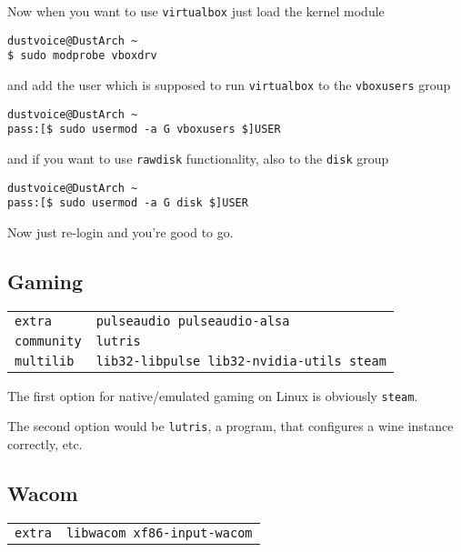 \documentclass[9pt]{report}
\newenvironment{packagetable}
{\begin{longtabu}to \textwidth [b]{X[1,r]|X[1,l]}}
{\end{longtabu}}
\begin{document}
Now when you want to use \texttt{virtualbox} just load the kernel module


\begin{verbatim}
dustvoice@DustArch ~
$ sudo modprobe vboxdrv
\end{verbatim}

and add the user which is supposed to run \texttt{virtualbox} to the \texttt{vboxusers} group


\begin{verbatim}
dustvoice@DustArch ~
pass:[$ sudo usermod -a G vboxusers $]USER
\end{verbatim}

and if you want to use \texttt{rawdisk} functionality, also to the \texttt{disk} group


\begin{verbatim}
dustvoice@DustArch ~
pass:[$ sudo usermod -a G disk $]USER
\end{verbatim}

Now just re-login and you’re good to go.



\newpage

\hypertarget{x-gaming}{\subsection{Gaming}}
\begin{packagetable}
    \texttt{extra} & \texttt{pulseaudio pulseaudio-alsa} \\ 
    \texttt{community} & \texttt{lutris} \\ 
    \texttt{multilib} & \texttt{lib32-libpulse lib32-nvidia-utils steam} \\ 
\end{packagetable}

The first option for native/emulated gaming on Linux is obviously \texttt{steam}.


The second option would be \texttt{lutris}, a program, that configures a wine instance correctly, etc.



\newpage

\hypertarget{x-wacom}{\subsection{Wacom}}
\begin{packagetable}
    \texttt{extra} & \texttt{libwacom xf86-input-wacom} \\ 
\end{packagetable}
\end{document}
